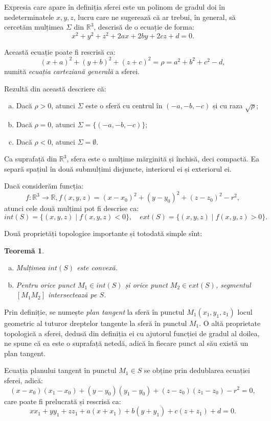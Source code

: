 \documentclass[11pt,a4paper]{article}
\theoremstyle{dotless}
\newtheorem{theorem}{Teorem\u{a}}[section]
\theoremstyle{dotlessdr}
\begin{document}
Expresia care apare în definiția sferei este un polinom de gradul doi în
nedeterminatele $x, y, z$, lucru care ne sugerează că ar trebui, în general,
să cercetăm mulțimea $\Sigma$ din $\mathbb{R}^3$, descrisă de o ecuație
de forma: 
 \[
	x^2 + y^2 + z^2 + 2ax + 2by + 2cz + d = 0.
\]

Această ecuație poate fi rescrisă ca: 
 \[
	(x + a)^2 + (y + b)^2 + (z + c)^2 = \rho = a^2 + b^2 + c^2 - d,
\]
numită \emph{ecuația carteziană generală} a sferei.

Rezultă din această descriere că:
\begin{enumerate}[(a)]
	\item Dacă $\rho > 0$, atunci $\Sigma$ este o sferă cu centrul în 
$(-a, -b, -c)$ și cu raza $\sqrt{\rho}$;
    \item Dacă $\rho = 0$, atunci $\Sigma = \{(-a, -b, -c)\}$;
    \item Dacă $\rho < 0$, atunci $\Sigma = \emptyset$.
\end{enumerate}

Ca suprafață din $\mathbb{R}^3$, sfera este o mulțime mărginită și închisă,
deci compactă. Ea separă spațiul în două submulțimi disjuncte, interiorul ei și
exteriorul ei. 

Dacă considerăm funcția: 
 \[
	f : \mathbb{R}^3 \to \mathbb{R},
	f(x, y, z) = (x - x_0)^2 + (y - y_0)^2 + (z - z_0)^2 - r^2,
\]
atunci cele două mulțimi pot fi descrise ca: 
 \[
	int(S) = \{(x, y, z) \mid f(x, y, z) < 0 \}, \quad
	ext(S) = \{(x, y, z) \mid f(x, y, z) > 0 \}.
\]

Două proprietăți topologice importante și totodată simple sînt:
\begin{theorem}
\begin{enumerate}[(a)]
	\item Mulțimea $int(S)$ este convexă.
	\item Pentru orice punct $M_1 \in int(S)$ și orice punct $M_2 \in ext(S)$,
segmentul $[M_1M_2]$ intersectează pe $S$.
\end{enumerate} 
\end{theorem}

Prin definiție, se numește \emph{plan tangent} la sferă în punctul 
$M_1(x_1, y_1, z_1)$ locul geometric al tuturor dreptelor tangente la sferă
în punctul $M_1$. O altă proprietate topologică a sferei, dedusă din definiția
ei cu ajutorul funcției de gradul al doilea, ne spune că ea este o suprafață
netedă, adică în fiecare punct al său există un plan tangent.

Ecuația planului tangent în punctul $M_1 \in S$ se obține prin dedublarea
ecuației sferei, adică: 
 \[
(x - x_0)(x_1 - x_0) + (y - y_0)(y_1 - y_0) + (z - z_0)(z_1 - z_0) - r^2 = 0,
\]
care poate fi prelucrată și rescrisă ca: 
 \[
	xx_1 + yy_1 + zz_1 + a(x + x_1) + b(y + y_1) + c(z + z_1) + d = 0.
\]
\end{document}
